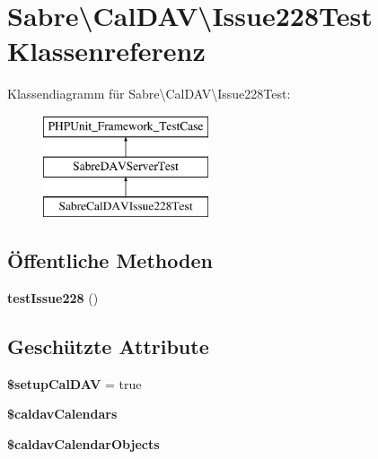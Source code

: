 \hypertarget{class_sabre_1_1_cal_d_a_v_1_1_issue228_test}{}\section{Sabre\textbackslash{}Cal\+D\+AV\textbackslash{}Issue228\+Test Klassenreferenz}
\label{class_sabre_1_1_cal_d_a_v_1_1_issue228_test}
Klassendiagramm für Sabre\textbackslash{}Cal\+D\+AV\textbackslash{}Issue228\+Test\+:\begin{figure}[H]
\begin{center}
\leavevmode
\includegraphics[height=3.000000cm]{class_sabre_1_1_cal_d_a_v_1_1_issue228_test}
\end{center}
\end{figure}
\subsection*{Öffentliche Methoden}
\begin{DoxyCompactItemize}
\item 
\mbox{\label{class_sabre_1_1_cal_d_a_v_1_1_issue228_test_a006e539bb3d53f6af5e0941a630b20bc}} 
{\bfseries test\+Issue228} ()
\end{DoxyCompactItemize}
\subsection*{Geschützte Attribute}
\begin{DoxyCompactItemize}
\item 
\mbox{\label{class_sabre_1_1_cal_d_a_v_1_1_issue228_test_ab3a82d8dd0c3da058a5c472ead911c9b}} 
{\bfseries \$setup\+Cal\+D\+AV} = true
\item 
{\bfseries \$caldav\+Calendars}
\item 
{\bfseries \$caldav\+Calendar\+Objects}
\end{DoxyCompactItemize}


